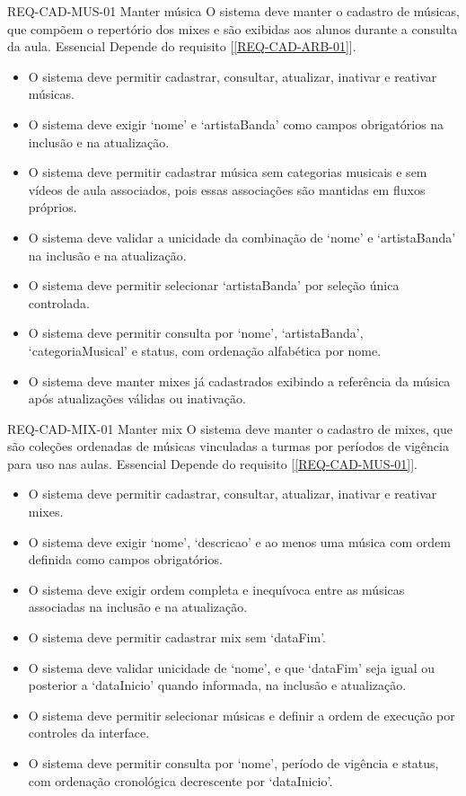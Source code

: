 \reqfunccad
{REQ-CAD-MUS-01 Manter música}
{O sistema deve manter o cadastro de músicas, que compõem o repertório dos mixes e são exibidas aos alunos durante a consulta da aula.}
{Essencial}
{Depende do requisito [\ref{REQ-CAD-ARB-01}].}
{\begin{itemize}[leftmargin=0.6cm]
    \item O sistema deve permitir cadastrar, consultar, atualizar, inativar e reativar músicas.
    \item O sistema deve exigir `nome' e `artistaBanda' como campos obrigatórios na inclusão e na atualização.
    \item O sistema deve permitir cadastrar música sem categorias musicais e sem vídeos de aula associados, pois essas associações são mantidas em fluxos próprios.
    \item O sistema deve validar a unicidade da combinação de `nome' e `artistaBanda' na inclusão e na atualização.
    \item O sistema deve permitir selecionar `artistaBanda' por seleção única controlada.
    \item O sistema deve permitir consulta por `nome', `artistaBanda', `categoriaMusical' e status, com ordenação alfabética por nome.
    \item O sistema deve manter mixes já cadastrados exibindo a referência da música após atualizações válidas ou inativação.
\end{itemize}}


\reqfunccad
{REQ-CAD-MIX-01 Manter mix}
{O sistema deve manter o cadastro de mixes, que são coleções ordenadas de músicas vinculadas a turmas por períodos de vigência para uso nas aulas.}
{Essencial}
{Depende do requisito [\ref{REQ-CAD-MUS-01}].}
{\begin{itemize}[leftmargin=0.6cm]
    \item O sistema deve permitir cadastrar, consultar, atualizar, inativar e reativar mixes.
    \item O sistema deve exigir `nome', `descricao' e ao menos uma música com ordem definida como campos obrigatórios.
    \item O sistema deve exigir ordem completa e inequívoca entre as músicas associadas na inclusão e na atualização.
    \item O sistema deve permitir cadastrar mix sem `dataFim'.
    \item O sistema deve validar unicidade de `nome', e que `dataFim' seja igual ou posterior a `dataInicio' quando informada, na inclusão e atualização.
    \item O sistema deve permitir selecionar músicas e definir a ordem de execução por controles da interface.
    \item O sistema deve permitir consulta por `nome', período de vigência e status, com ordenação cronológica decrescente por `dataInicio'.
\end{itemize}}

